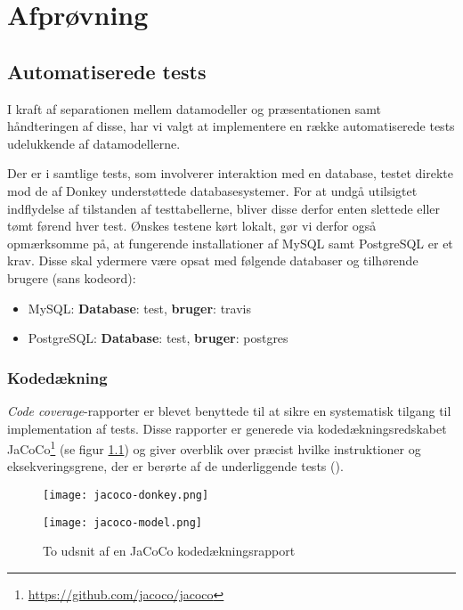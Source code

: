\chapter{Afprøvning}
\label{chapter:afproevning}

\section{Automatiserede tests}

I kraft af separationen mellem datamodeller og præsentationen samt håndteringen af disse, har vi valgt at implementere en række automatiserede tests udelukkende af datamodellerne.

Der er i samtlige tests, som involverer interaktion med en database, testet direkte mod de af Donkey understøttede databasesystemer. For at undgå utilsigtet indflydelse af tilstanden af testtabellerne, bliver disse derfor enten slettede eller tømt førend hver test. Ønskes testene kørt lokalt, gør vi derfor også opmærksomme på, at fungerende installationer af MySQL samt PostgreSQL er et krav. Disse skal ydermere være opsat med følgende databaser og tilhørende brugere (sans kodeord):

\begin{itemize}
  \item MySQL: \textbf{Database}: test, \textbf{bruger}: travis
  \item PostgreSQL: \textbf{Database}: test, \textbf{bruger}: postgres
\end{itemize}

\subsection{Kodedækning}
\label{subsection:kodedeakning}

\textit{Code coverage}-rapporter er blevet benyttede til at sikre en systematisk tilgang til implementation af tests. Disse rapporter er generede via kodedækningsredskabet JaCoCo\footnote{\url{https://github.com/jacoco/jacoco}} (se figur \ref{code-coverage:donkey}) og giver overblik over præcist hvilke instruktioner og eksekveringsgrene, der er berørte af de underliggende tests (\cite{wiki:code-cov}).

\begin{figure}[h]
  \begin{minipage}[b]{0.45\linewidth}
    \centering
    \texttt{[image: jacoco-donkey.png]}
  \end{minipage}
  \hspace{0.5cm}
  \begin{minipage}[b]{0.45\linewidth}
    \centering
    \texttt{[image: jacoco-model.png]}
  \end{minipage}
  
  \caption{To udsnit af en JaCoCo kodedækningsrapport}
  \label{code-coverage:donkey}
\end{figure}

